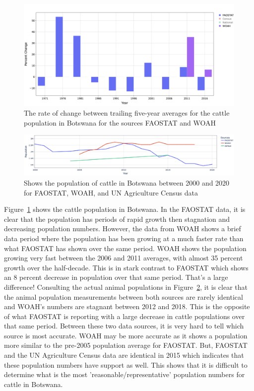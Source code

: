 \documentclass{article}
\begin{document}
\begin{figure}[h!]
    \centering
    \includegraphics[width=1\textwidth]{image11}
    \caption{The rate of change between trailing five-year averages for the cattle population in Botswana for the sources FAOSTAT and WOAH}
    \label{fig:image11}
\end{figure}

\begin{figure}[h!]
    \centering
    \includegraphics[width=1\textwidth]{image12}
    \caption{Shows the population of cattle in Botswana between 2000 and 2020 for FAOSTAT, WOAH, and UN Agriculture Census data}
    \label{fig:image12}
\end{figure}

Figure~\ref{fig:image11} shows the cattle population in Botswana. In the FAOSTAT data, it is clear that the population has periods of rapid growth then stagnation and decreasing population numbers. However, the data from WOAH shows a brief data period where the population has been growing at a much faster rate than what FAOSTAT has shown over the same period. WOAH shows the population growing very fast between the 2006 and 2011 averages, with almost 35 percent growth over the half-decade. This is in stark contrast to FAOSTAT which shows an 8 percent decrease in population over that same period. That’s a large difference! Consulting the actual animal populations in Figure~\ref{fig:image12}, it is clear that the animal population measurements between both sources are rarely identical and WOAH's numbers are stagnant between 2012 and 2018. This is the opposite of what FAOSTAT is reporting with a large decrease in cattle populations over that same period. Between these two data sources, it is very hard to tell which source is most accurate. WOAH may be more accurate as it shows a population more similar to the pre-2005 population average for FAOSTAT. But, FAOSTAT and the UN Agriculture Census data are identical in 2015 which indicates that these population numbers have support as well. This shows that it is difficult to determine what is the most 'reasonable/representative' population numbers for cattle in Botswana. 
\end{document}
